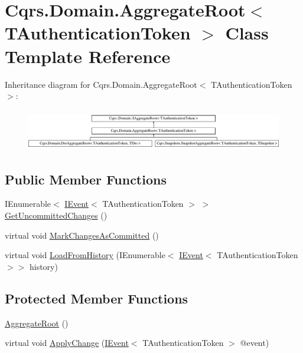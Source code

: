 \hypertarget{classCqrs_1_1Domain_1_1AggregateRoot}{}\section{Cqrs.\+Domain.\+Aggregate\+Root$<$ T\+Authentication\+Token $>$ Class Template Reference}
\label{classCqrs_1_1Domain_1_1AggregateRoot}
Inheritance diagram for Cqrs.\+Domain.\+Aggregate\+Root$<$ T\+Authentication\+Token $>$\+:\begin{figure}[H]
\begin{center}
\leavevmode
\includegraphics[height=1.822126cm]{classCqrs_1_1Domain_1_1AggregateRoot}
\end{center}
\end{figure}
\subsection*{Public Member Functions}
\begin{DoxyCompactItemize}
\item 
I\+Enumerable$<$ \hyperlink{interfaceCqrs_1_1Events_1_1IEvent}{I\+Event}$<$ T\+Authentication\+Token $>$ $>$ \hyperlink{classCqrs_1_1Domain_1_1AggregateRoot_a625e885ec7885a686f729ed1efe3a8fa_a625e885ec7885a686f729ed1efe3a8fa}{Get\+Uncommitted\+Changes} ()
\item 
virtual void \hyperlink{classCqrs_1_1Domain_1_1AggregateRoot_adab968b830e186cb832583910bf6f3a6_adab968b830e186cb832583910bf6f3a6}{Mark\+Changes\+As\+Committed} ()
\item 
virtual void \hyperlink{classCqrs_1_1Domain_1_1AggregateRoot_aec873ad6e4c98309cad2d9f1c534aebb_aec873ad6e4c98309cad2d9f1c534aebb}{Load\+From\+History} (I\+Enumerable$<$ \hyperlink{interfaceCqrs_1_1Events_1_1IEvent}{I\+Event}$<$ T\+Authentication\+Token $>$$>$ history)
\end{DoxyCompactItemize}
\subsection*{Protected Member Functions}
\begin{DoxyCompactItemize}
\item 
\hyperlink{classCqrs_1_1Domain_1_1AggregateRoot_a1db2322dd7442e1e0c3c07332124eb2f_a1db2322dd7442e1e0c3c07332124eb2f}{Aggregate\+Root} ()
\item 
virtual void \hyperlink{classCqrs_1_1Domain_1_1AggregateRoot_a7e299b13c7556731e52670aa6d782296_a7e299b13c7556731e52670aa6d782296}{Apply\+Change} (\hyperlink{interfaceCqrs_1_1Events_1_1IEvent}{I\+Event}$<$ T\+Authentication\+Token $>$ @event)
\end{DoxyCompactItemize}
